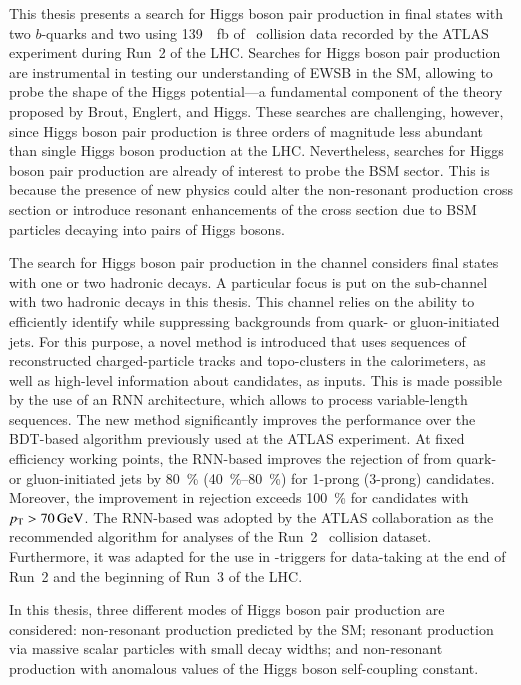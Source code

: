 This thesis presents a search for Higgs boson pair production in final states
with two $b$-quarks and two \tauleptons using \SI{139}{\per\femto\barn} of
\pp~collision data recorded by the ATLAS experiment during Run~2 of the
LHC. Searches for Higgs boson pair production are instrumental in testing our
understanding of EWSB in the SM, allowing to probe the shape of the Higgs
potential---a fundamental component of the theory proposed by Brout, Englert,
and Higgs. These searches are challenging, however, since Higgs boson pair
production is three orders of magnitude less abundant than single Higgs boson
production at the LHC. Nevertheless, searches for Higgs boson pair production
are already of interest to probe the BSM sector. This is because the presence of
new physics could alter the non-resonant \HH production cross section or
introduce resonant enhancements of the cross section due to BSM particles
decaying into pairs of Higgs bosons.


The search for Higgs boson pair production in the \bbtautau channel considers
final states with one or two hadronic \taulepton decays. A particular focus is
put on the sub-channel with two hadronic \taulepton decays in this thesis. This
channel relies on the ability to efficiently identify \tauhadvis while
suppressing backgrounds from quark- or gluon-initiated jets. For this purpose, a
novel \tauid method is introduced that uses sequences of reconstructed
charged-particle tracks and topo-clusters in the calorimeters, as well as
high-level information about \tauhadvis candidates, as inputs. This is made
possible by the use of an RNN architecture, which allows to process
variable-length sequences. The new method significantly improves the \tauid
performance over the BDT-based algorithm previously used at the ATLAS
experiment. At fixed \tauhadvis efficiency working points, the RNN-based \tauid
improves the rejection of \faketauhadvis from quark- or gluon-initiated jets by
\SI{80}{\percent} (\SIrange{40}{80}{\percent}) for 1-prong (3-prong) \tauhadvis
candidates. Moreover, the improvement in \faketauhadvis rejection exceeds
\SI{100}{\percent} for candidates with $\pT > \SI{70}{\GeV}$. The RNN-based
\tauid was adopted by the ATLAS collaboration as the recommended \tauid
algorithm for analyses of the Run~2 \pp~collision dataset. Furthermore, it was
adapted for the use in \tauhadvis-triggers for data-taking at the end of Run~2
and the beginning of Run~3 of the LHC.


In this thesis, three different modes of Higgs boson pair production are
considered: non-resonant \HH production predicted by the SM; resonant \HH
production via massive scalar particles with small decay widths; and
non-resonant \HH production with anomalous values of the Higgs boson
self-coupling constant.


